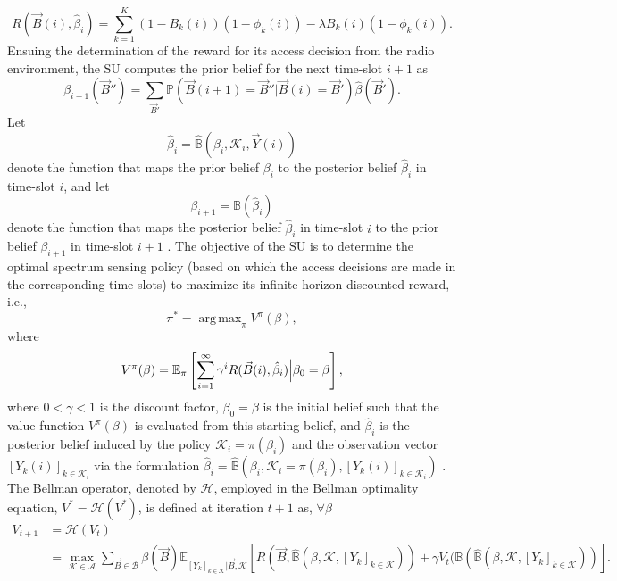 \documentclass[12pt, draftcls, onecolumn]{IEEEtran}
\DeclareMathOperator*{\argmax}{arg\,max}
\begin{document}
\begin{equation}\label{12}
    R(\vec{B}(i),\hat{\beta}_{i})=\sum_{k=1}^{K}(1-B_{k}(i))(1-\phi_{k}(i))-\lambda B_{k}(i)(1-\phi_{k}(i)).
\end{equation}
Ensuing the determination of the reward for its access decision from the radio environment, the SU computes the prior belief for the next time-slot $i+1$ as
\begin{equation}\label{13}
    \beta_{i+1}(\vec{B}'')=\sum_{\vec{B}'}\mathbb{P}(\vec{B}(i+1)=\vec{B}''|\vec{B}(i)=\vec{B}')\hat{\beta}(\vec{B}').
\end{equation}
Let
\begin{equation}\label{14}
    \hat{\beta}_{i}=\hat{\mathbb{B}}(\beta_{i},\mathcal{K}_{i},\vec{Y}(i))
\end{equation}
denote the function that maps the prior belief $\beta_{i}$ to the posterior belief $\hat{\beta}_{i}$ in time-slot $i$, and let
\begin{equation}\label{15}
    \beta_{i+1}=\mathbb{B}(\hat{\beta}_{i})
\end{equation}
denote the function that maps the posterior belief $\hat{\beta}_{i}$ in time-slot $i$ to the prior belief $\beta_{i+1}$ in time-slot $i+1$ \cite{WCL:paper}. The objective of the SU is to determine the optimal spectrum sensing policy (based on which the access decisions are made in the corresponding time-slots) to maximize its infinite-horizon discounted reward, i.e.,
\begin{equation}\label{16}
    \pi^{*}=\argmax_{\pi}V^{\pi}(\beta),
\end{equation}
where
\begin{equation}\label{17}
    V^{\pi}(\beta)=\mathbb{E}_{\pi}\left[\sum_{i=1}^{\infty}\gamma^{i}R(\vec{B}(i),\hat{\beta}_{i})\Big{|}\beta_{0}=\beta\right],
\end{equation}
where $0{<}\gamma{<}1$ is the discount factor, $\beta_{0}{=}\beta$ is the initial belief such that the value function $V^{\pi}(\beta)$ is evaluated from this starting belief, and $\hat{\beta}_{i}$ is the posterior belief induced by the policy $\mathcal{K}_{i}{=}\pi(\beta_{i})$ and the observation vector $[Y_{k}(i)]_{k{\in}\mathcal{K}_{i}}$ via the formulation $\hat{\beta}_{i}{=}\hat{\mathbb{B}}(\beta_{i},\mathcal{K}_{i}{=}\pi(\beta_{i}),[Y_{k}(i)]_{k{\in}\mathcal{K}_{i}})$ \cite{WCL:paper}. The Bellman operator, denoted by $\mathcal{H}$, employed in the Bellman optimality equation, $V^{*}{=}\mathcal{H}(V^{*})$, is defined at iteration $t+1$ as, $\forall{\beta}$
\begin{equation}\label{18}
    \begin{aligned}
        V_{t+1}&=\mathcal{H}(V_{t})\\
        &=\max_{\mathcal{K} \in \mathcal{A}}\sum_{\vec{B} \in \mathcal{B}}\beta(\vec{B})\mathbb{E}_{[Y_{k}]_{k \in \mathcal{K}}|\vec{B},\mathcal{K}}\left[R(\vec{B},\hat{\mathbb{B}}(\beta,\mathcal{K},[Y_{k}]_{k \in \mathcal{K}}))+\gamma V_{t}(\mathbb{B}(\hat{\mathbb{B}}(\beta,\mathcal{K},[Y_{k}]_{k \in \mathcal{K}}))\right].
    \end{aligned}
\end{equation}
\end{document}
